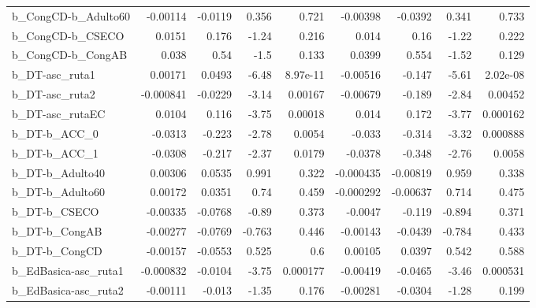 \begin{tabular}{lrrrrrrrr}
b\_CongCD-b\_Adulto60        &    -0.00114 &      -0.0119 &     0.356 &    0.721 &   -0.00398 &     -0.0392 &        0.341 &         0.733 \\
b\_CongCD-b\_CSECO           &      0.0151 &        0.176 &     -1.24 &    0.216 &      0.014 &        0.16 &        -1.22 &         0.222 \\
b\_CongCD-b\_CongAB          &       0.038 &         0.54 &      -1.5 &    0.133 &     0.0399 &       0.554 &        -1.52 &         0.129 \\
b\_DT-asc\_ruta1             &     0.00171 &       0.0493 &     -6.48 & 8.97e-11 &   -0.00516 &      -0.147 &        -5.61 &      2.02e-08 \\
b\_DT-asc\_ruta2             &   -0.000841 &      -0.0229 &     -3.14 &  0.00167 &   -0.00679 &      -0.189 &        -2.84 &       0.00452 \\
b\_DT-asc\_rutaEC            &      0.0104 &        0.116 &     -3.75 &  0.00018 &      0.014 &       0.172 &        -3.77 &      0.000162 \\
b\_DT-b\_ACC\_0               &     -0.0313 &       -0.223 &     -2.78 &   0.0054 &     -0.033 &      -0.314 &        -3.32 &      0.000888 \\
b\_DT-b\_ACC\_1               &     -0.0308 &       -0.217 &     -2.37 &   0.0179 &    -0.0378 &      -0.348 &        -2.76 &        0.0058 \\
b\_DT-b\_Adulto40            &     0.00306 &       0.0535 &     0.991 &    0.322 &  -0.000435 &    -0.00819 &        0.959 &         0.338 \\
b\_DT-b\_Adulto60            &     0.00172 &       0.0351 &      0.74 &    0.459 &  -0.000292 &    -0.00637 &        0.714 &         0.475 \\
b\_DT-b\_CSECO               &    -0.00335 &      -0.0768 &     -0.89 &    0.373 &    -0.0047 &      -0.119 &       -0.894 &         0.371 \\
b\_DT-b\_CongAB              &    -0.00277 &      -0.0769 &    -0.763 &    0.446 &   -0.00143 &     -0.0439 &       -0.784 &         0.433 \\
b\_DT-b\_CongCD              &    -0.00157 &      -0.0553 &     0.525 &      0.6 &    0.00105 &      0.0397 &        0.542 &         0.588 \\
b\_EdBasica-asc\_ruta1       &   -0.000832 &      -0.0104 &     -3.75 & 0.000177 &   -0.00419 &     -0.0465 &        -3.46 &      0.000531 \\
b\_EdBasica-asc\_ruta2       &    -0.00111 &       -0.013 &     -1.35 &    0.176 &   -0.00281 &     -0.0304 &        -1.28 &         0.199 \\

\end{tabular}
